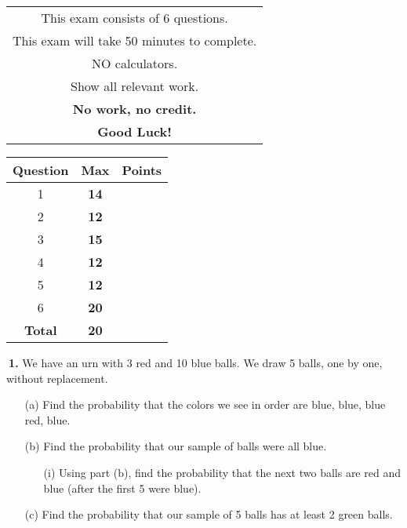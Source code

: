 \documentclass[12pt]{report}
\begin{document}
\begin{minipage}[b]{80mm}
\begin{tabular}{c}
\noindent This exam consists of 6 questions. \\

\noindent This exam will take 50 minutes to complete. \\

\noindent NO calculators.\\

\noindent Show all relevant work.\\
\noindent \textbf{No work, no credit.}\\

\noindent \textbf{Good Luck!}\\
\end{tabular}
\end{minipage}
\begin{minipage}[b]{80mm}
\begin{tabular}{ |c|c|c| }
	\hline
	\textbf{Question} & \textbf{Max} & \textbf{Points} \\
	\hline
	\hline
	1& \textbf{14} & \\
	\hline
	2& \textbf{12} & \\
	\hline
	3& \textbf{15} & \\
	\hline
	4& \textbf{12} & \\
	\hline
	5& \textbf{12} & \\
	\hline
	6& \textbf{20} & \\
	\hline
	\hline
	\textbf{Total} & \textbf{20} & \\
	\hline
\end{tabular}
\end{minipage}

\pagebreak








\noindent {} $~$\textbf{1.} We have an urn with 3 red and 10 blue balls. We draw 5 balls, one by one, without replacement. 
\begin{itemize}
\item [(a)] Find the probability that the colors we see in order are blue, blue, blue red, blue.		%
\item [(b)] Find the probability that our sample of balls were all blue.					%
	\begin{itemize}
	\item [(i)] Using part (b), find the probability that the next two balls are red and blue (after the first 5 were blue).   %
	\end{itemize}
\item [(c)]  Find the probability that our sample of 5 balls has at least 2 green balls. 		%
\end{itemize}
\pagebreak
\end{document}
